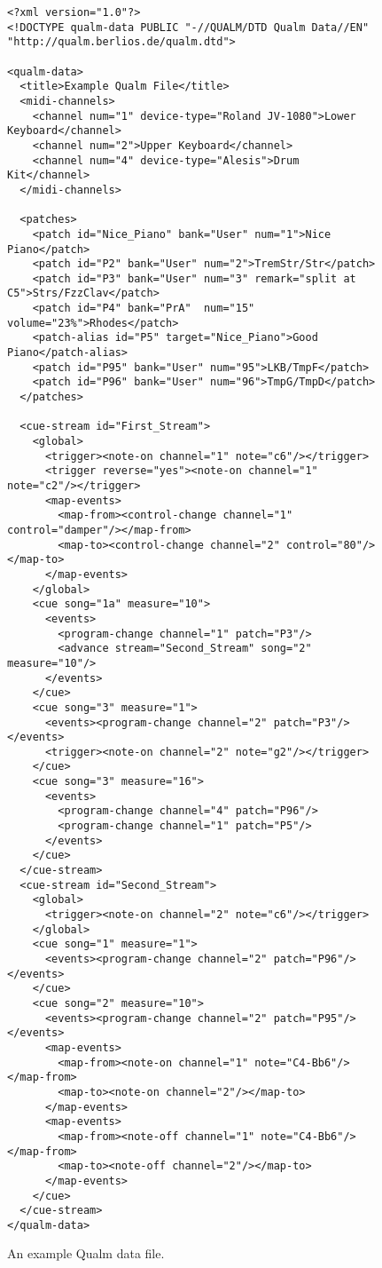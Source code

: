 \documentclass{article}
\newcommand{\q}{{\textsf{Qualm}}\xspace}
\begin{document}
\begin{figure}
\begin{scriptsize}
\begin{verbatim}
<?xml version="1.0"?>
<!DOCTYPE qualm-data PUBLIC "-//QUALM/DTD Qualm Data//EN" "http://qualm.berlios.de/qualm.dtd">

<qualm-data>
  <title>Example Qualm File</title>
  <midi-channels>
    <channel num="1" device-type="Roland JV-1080">Lower Keyboard</channel>
    <channel num="2">Upper Keyboard</channel>
    <channel num="4" device-type="Alesis">Drum Kit</channel>
  </midi-channels>

  <patches>
    <patch id="Nice_Piano" bank="User" num="1">Nice Piano</patch>
    <patch id="P2" bank="User" num="2">TremStr/Str</patch>
    <patch id="P3" bank="User" num="3" remark="split at C5">Strs/FzzClav</patch>
    <patch id="P4" bank="PrA"  num="15" volume="23%">Rhodes</patch>
    <patch-alias id="P5" target="Nice_Piano">Good Piano</patch-alias>
    <patch id="P95" bank="User" num="95">LKB/TmpF</patch>
    <patch id="P96" bank="User" num="96">TmpG/TmpD</patch>
  </patches>

  <cue-stream id="First_Stream">
    <global>
      <trigger><note-on channel="1" note="c6"/></trigger>
      <trigger reverse="yes"><note-on channel="1" note="c2"/></trigger>
      <map-events>
        <map-from><control-change channel="1" control="damper"/></map-from>
        <map-to><control-change channel="2" control="80"/></map-to>
      </map-events>
    </global>
    <cue song="1a" measure="10">
      <events>
        <program-change channel="1" patch="P3"/>
        <advance stream="Second_Stream" song="2" measure="10"/>
      </events>
    </cue>
    <cue song="3" measure="1">
      <events><program-change channel="2" patch="P3"/></events>
      <trigger><note-on channel="2" note="g2"/></trigger>
    </cue>
    <cue song="3" measure="16">
      <events>
        <program-change channel="4" patch="P96"/>
        <program-change channel="1" patch="P5"/>
      </events>
    </cue>
  </cue-stream>
  <cue-stream id="Second_Stream">
    <global>
      <trigger><note-on channel="2" note="c6"/></trigger>
    </global>
    <cue song="1" measure="1">
      <events><program-change channel="2" patch="P96"/></events>
    </cue>
    <cue song="2" measure="10">
      <events><program-change channel="2" patch="P95"/></events>
      <map-events>
        <map-from><note-on channel="1" note="C4-Bb6"/></map-from>
        <map-to><note-on channel="2"/></map-to>
      </map-events>
      <map-events>
        <map-from><note-off channel="1" note="C4-Bb6"/></map-from>
        <map-to><note-off channel="2"/></map-to>
      </map-events>
    </cue>
  </cue-stream>
</qualm-data>
\end{verbatim}
\end{scriptsize}
\caption{An example \q data file.\label{example-file}}
\end{figure}
\end{document}
